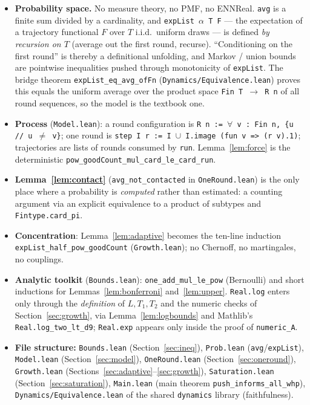 \documentclass[11pt]{article}
\begin{document}
\begin{itemize}[leftmargin=2em]
\item \textbf{Probability space.} No measure theory, no PMF, no ENNReal.
  \texttt{avg} is a finite sum divided by a cardinality, and
  \texttt{expList $\alpha$ T F} — the expectation of a trajectory functional
  $F$ over $T$ i.i.d.\ uniform draws — is defined \emph{by recursion on $T$}
  (average out the first round, recurse).  ``Conditioning on the first
  round'' is thereby a definitional unfolding, and Markov / union bounds are
  pointwise inequalities pushed through monotonicity of \texttt{expList}.
  The bridge theorem \texttt{expList\_eq\_avg\_ofFn}
  (\texttt{Dynamics/Equivalence.lean}) proves this equals the uniform average over
  the product space \texttt{Fin T $\to$ R n} of all round sequences, so the
  model is the textbook one.
\item \textbf{Process} (\texttt{Model.lean}): a round configuration is
  \texttt{R n := $\forall$ v : Fin n, \{u // u $\ne$ v\}}; one round is
  \texttt{step I r := I $\cup$ I.image (fun v => (r v).1)}; trajectories are
  lists of rounds consumed by \texttt{run}.  Lemma~\ref{lem:force} is the
  deterministic \texttt{pow\_goodCount\_mul\_card\_le\_card\_run}.
\item \textbf{Lemma~\ref{lem:contact}} (\texttt{avg\_not\_contacted} in
  \texttt{OneRound.lean}) is the only place where a probability is
  \emph{computed} rather than estimated: a counting argument via an
  explicit equivalence to a product of subtypes and
  \texttt{Fintype.card\_pi}.
\item \textbf{Concentration}: Lemma~\ref{lem:adaptive} becomes the
  ten-line induction \texttt{expList\_half\_pow\_goodCount}
  (\texttt{Growth.lean}); no Chernoff, no martingales, no couplings.
\item \textbf{Analytic toolkit} (\texttt{Bounds.lean}):
  \texttt{one\_add\_mul\_le\_pow} (Bernoulli) and short inductions for
  Lemmas~\ref{lem:bonferroni} and~\ref{lem:upper}.  \texttt{Real.log}
  enters only through the \emph{definition} of $L, T_1, T_2$ and the
  numeric checks of Section~\ref{sec:growth}, via
  Lemma~\ref{lem:logbounds} and Mathlib's
  \texttt{Real.log\_two\_lt\_d9}; \texttt{Real.exp} appears only inside the
  proof of \texttt{numeric\_A}.
\item \textbf{File structure:}
  \texttt{Bounds.lean} (Section~\ref{sec:ineq}),
  \texttt{Prob.lean} (\texttt{avg}/\texttt{expList}),
  \texttt{Model.lean} (Section~\ref{sec:model}),
  \texttt{OneRound.lean} (Section~\ref{sec:oneround}),
  \texttt{Growth.lean} (Sections~\ref{sec:adaptive}--\ref{sec:growth}),
  \texttt{Saturation.lean} (Section~\ref{sec:saturation}),
  \texttt{Main.lean} (main theorem
  \texttt{push\_informs\_all\_whp}),
  \texttt{Dynamics/Equivalence.lean} of the shared \texttt{dynamics} library (faithfulness).
\end{itemize}
\end{document}
